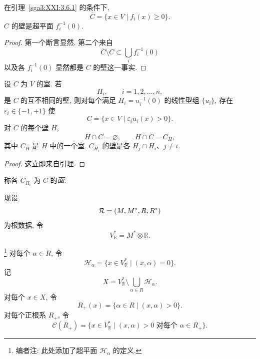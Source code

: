 \begin{lemma}\label{sga3:XXI:3.6.5}
在引理~\ref{sga3:XXI:3.6.1} 的条件下,
\[
 \overline C=\{x\in V\mid f_i(x)\ge0\}.
\]
\(C\) 的壁是超平面 \(f_i^{-1}(0)\).
\end{lemma}
\begin{proof}
第一个断言显然. 第二个来自
\[
 \overline C\setminus C\subset\bigcup_i f_i^{-1}(0)
\]
以及各 \(f_i^{-1}(0)\) 显然都是 \(C\) 的壁这一事实.
\end{proof}

\begin{proposition}\label{sga3:XXI:3.6.6}
设 \(C\) 为 \(V\) 的室. 若
\[
 H_i,\qquad i=1,2,\ldots,n,
\]
是 \(C\) 的互不相同的壁, 则对每个满足 \(H_i=u_i^{-1}(0)\) 的线性型组 \(\{u_i\}\), 存在 \(\varepsilon_i\in\{-1,+1\}\) 使
\[
 C=\{x\in V\mid\varepsilon_i u_i(x)>0\}.
\]
对 \(C\) 的每个壁 \(H\),
\[
 H\cap C=\varnothing,
 \qquad
 H\cap\overline C=\overline{C_H},
\]
其中 \(C_H\) 是 \(H\) 中的一个室. \(C_{H_i}\) 的壁是各 \(H_j\cap H_i\)、\(j\ne i\).
\end{proposition}
\begin{proof}
这立即来自引理.
\end{proof}

\begin{definition}\label{sga3:XXI:3.6.7}
称各 \(C_{H_i}\) 为 \(C\) 的\emph{面}.
\end{definition}
现设
\[
 \mathcal{R}=(M,M^\ast,R,R^\ast)
\]
为根数据, 令
\[
 V_{\mathbb{R}}^\ast=M^\ast\otimes\mathbb{R}.
\]

\begin{definition}\label{sga3:XXI:3.6.8}
\footnote{编者注: 此处添加了超平面 \(\mathcal{H}_\alpha\) 的定义.}
对每个 \(\alpha\in R\), 令
\[
 \mathcal{H}_\alpha
   =\{x\in V_{\mathbb{R}}^\ast\mid(x,\alpha)=0\}.
\]
记
\[
 X=V_{\mathbb{R}}^\ast
   \setminus\bigcup_{\alpha\in R}\mathcal{H}_\alpha.
\]
对每个 \(x\in X\), 令
\[
 R_+(x)=\{\alpha\in R\mid(x,\alpha)>0\}.
\]
对每个正根系 \(R_+\), 令
\[
 \mathcal{C}(R_+)
   =\{x\in V_{\mathbb{R}}^\ast
       \mid (x,\alpha)>0\text{ 对每个 }\alpha\in R_+\}.
\]
\end{definition}

